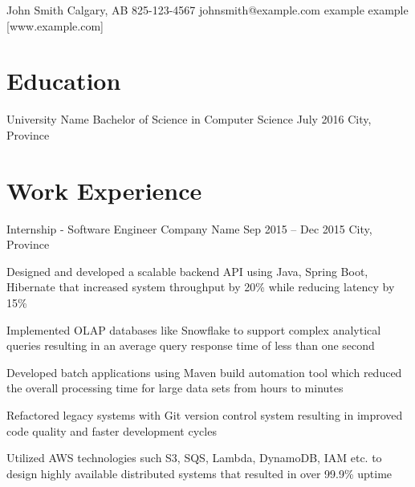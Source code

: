 \documentclass[letterpaper]{resume_config}
\begin{document}
\Header
    {John Smith} %
    {Calgary, AB} %
    {825-123-4567} %
    {johnsmith@example.com} %
    {example} %
    {example} %
    [www.example.com] %


\section{Education}

\EducationExperience
    {University Name} %
    {Bachelor of Science in Computer Science} %
    {July 2016} %
    {City, Province} %

\vspace{-14pt}


\section{Work Experience}

\WorkExperience
    {Internship - Software Engineer} %
    {Company Name} %
    {Sep 2015 -- Dec 2015} %
    {City, Province} %
    {
        \item Designed and developed a scalable backend API using Java, Spring Boot, Hibernate that increased system throughput by 20\% while reducing latency by 15\%
        \item Implemented OLAP databases like Snowflake to support complex analytical queries resulting in an average query response time of less than one second
        \item Developed batch applications using Maven build automation tool which reduced the overall processing time for large data sets from hours to minutes
        \item Refactored legacy systems with Git version control system resulting in improved code quality and faster development cycles
        \item Utilized AWS technologies such S3, SQS, Lambda, DynamoDB, IAM etc. to design highly available distributed systems that resulted in over 99.9\% uptime
    }
\end{document}

